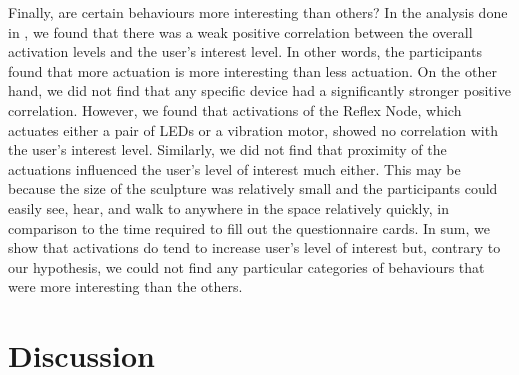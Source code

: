 Finally, are certain behaviours more interesting than others? In the analysis done in , we found that there was a weak positive correlation between the overall activation levels and the user's interest level. In other words, the participants found that more actuation is more interesting than less actuation. On the other hand, we did not find that any specific device had a significantly stronger positive correlation. However, we found that activations of the Reflex Node, which actuates either a pair of LEDs or a vibration motor, showed no correlation with the user's interest level. Similarly, we did not find that proximity of the actuations influenced the user's level of interest much either. This may be because the size of the sculpture was relatively small and the participants could easily see, hear, and walk to anywhere in the space relatively quickly, in comparison to the time required to fill out the questionnaire cards. In sum, we show that activations do tend to increase user's level of interest but, contrary to our hypothesis, we could not find any particular categories of behaviours that were more interesting than the others. 




\section{Discussion}

